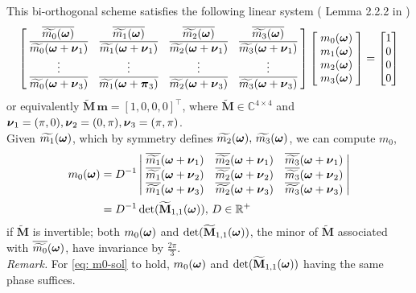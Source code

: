 This bi-orthogonal scheme satisfies the following linear system (
Lemma 2.2.2 in \cite{cohen1993compactly} )
\begin{align}\label{eq: LS}
\begin{bmatrix}
    \,\barm{0} & \barm{1} & \barm{2} & \barm{3}\;  \\
    \;\barmn{0}{1} & \barmn{1}{1}  & \barmn{2}{1}  & \barmn{3}{1}\; \\
    \;\vdots & \vdots & \vdots & \vdots \; \\
    \;\barmn{0}{3} & \barmp{1}{3} & \barmn{2}{3} & \barmn{3}{3}\;
\end{bmatrix}
\begin{bmatrix}
\;\mo{0}\; \\
\;\mo{1}\; \\
\;\mo{2}\; \\
\;\mo{3}\; 
\end{bmatrix} 
=
\begin{bmatrix}
1\\
0\\
0\\
0
\end{bmatrix}
\end{align}
 or equivalently \(\widetilde{\mathbf{M}}\, \mathbf{m} = [1,0,0,0]^\top\), where $\widetilde{\mathbf{M}}\in\mathbb{C}^{4\times 4}$ and $\V{\nu}_1 = (\pi,0),\V{\nu}_2 = (0,\pi),\V{\nu}_3=(\pi,\pi)$.\\
Given $\m{1}$, which by symmetry defines $\m{2},\,\m{3}$, we can compute $m_0$, 
\begin{align}\label{eq: m0-sol}
m_0(\V{\omega}) &= D^{-1}%
\left|
\begin{matrix}
    \; \sbarmn{1}{1}  & \sbarmn{2}{1}  & \sbarmn{3}{1}\; \\
    \; \sbarmn{1}{2}  & \sbarmn{2}{2}  & \sbarmn{3}{2}\; \\
    \; \sbarmn{1}{3} & \sbarmn{2}{3} & \sbarmn{3}{3}\;
\end{matrix}
\right| \notag\\
&= D^{-1}\det(\widetilde{\mathbf{M}}_{1,1}(\V{\omega})), \, D\in \mathbb{R}^+
\end{align}
if $\widetilde{\mathbf{M}}$ is invertible; both $\mo{0}$ and $\det(\widetilde{\mathbf{M}}_{1,1}(\V{\omega}))$, the minor of $\widetilde{\mathbf{M}}$ associated with $\sbarm{0}$, have invariance by $\frac{2\pi}{3}$.\\
{\it Remark.} For \eqref{eq: m0-sol} to hold, $\mo{0}$ and $\det(\widetilde{\mathbf{M}}_{1,1}(\V{\omega}))$ having the same phase suffices. \\
